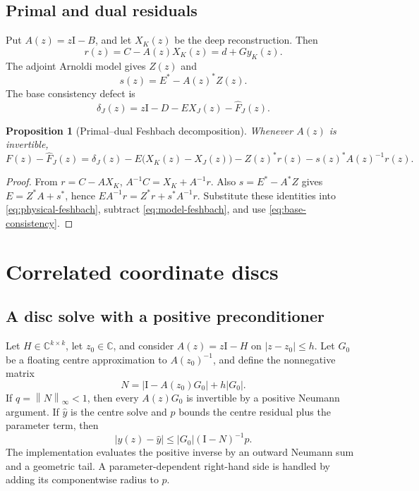 \documentclass[11pt]{article}
\newtheorem{proposition}[theorem]{Proposition}
\theoremstyle{definition}
\theoremstyle{remark}
\newcommand{\C}{\mathbb C}
\newcommand{\Id}{\mathrm I}
\newcommand{\norm}[1]{\left\lVert#1\right\rVert}
\newcommand{\absentry}[1]{\left|#1\right|}
\begin{document}
\subsection{Primal and dual residuals}

Put $A(z)=z\Id-B$, and let $X_K(z)$ be the deep reconstruction.  Then
\begin{equation}
 r(z)=C-A(z)X_K(z)=d+G y_K(z).
 \label{eq:primal-residual}
\end{equation}
The adjoint Arnoldi model gives $Z(z)$ and
\begin{equation}
 s(z)=E^*-A(z)^*Z(z).
 \label{eq:dual-residual}
\end{equation}
The base consistency defect is
\begin{equation}
 \delta_J(z)=z\Id-D-EX_J(z)-\widehat F_J(z).
 \label{eq:base-consistency}
\end{equation}

\begin{proposition}[Primal--dual Feshbach decomposition]
\label{prop:pd-identity}
Whenever $A(z)$ is invertible,
\begin{equation}
 F(z)-\widehat F_J(z)
 =\delta_J(z)-E\bigl(X_K(z)-X_J(z)\bigr)
  -Z(z)^*r(z)-s(z)^*A(z)^{-1}r(z).
 \label{eq:pd-decomposition}
\end{equation}
\end{proposition}

\begin{proof}
From $r=C-AX_K$, $A^{-1}C=X_K+A^{-1}r$.  Also
$s=E^*-A^*Z$ gives $E=Z^*A+s^*$, hence
$EA^{-1}r=Z^*r+s^*A^{-1}r$.  Substitute these identities into
\cref{eq:physical-feshbach}, subtract \cref{eq:model-feshbach}, and use
\cref{eq:base-consistency}.
\end{proof}

\section{Correlated coordinate discs}
\label{sec:coordinates}

\subsection{A disc solve with a positive preconditioner}

Let $H\in\C^{k\times k}$, let $z_0\in\C$, and consider
$A(z)=z\Id-H$ on $|z-z_0|\leq h$.  Let $G_0$ be a floating centre
approximation to $A(z_0)^{-1}$, and define the nonnegative matrix
\begin{equation}
 N=\absentry{\Id-A(z_0)G_0}+h\absentry{G_0}.
 \label{eq:N-majorant}
\end{equation}
If $q=\norm{N}_\infty<1$, then every $A(z)G_0$ is invertible by a
positive Neumann argument.  If $\widehat y$ is the centre solve and $p$
bounds the centre residual plus the parameter term, then
\begin{equation}
 \absentry{y(z)-\widehat y}
 \leq \absentry{G_0}(\Id-N)^{-1}p.
 \label{eq:coordinate-bound}
\end{equation}
The implementation evaluates the positive inverse by an outward Neumann sum
and a geometric tail.  A parameter-dependent right-hand side is handled by
adding its componentwise radius to $p$.
\end{document}
